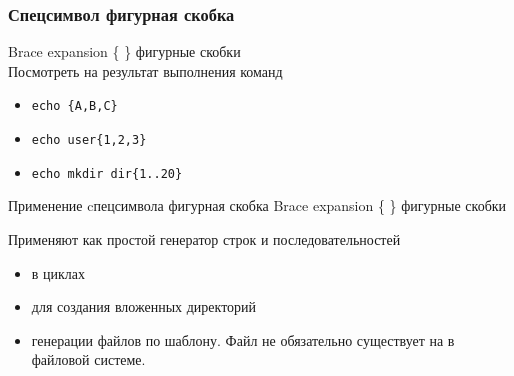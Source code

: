 \begin{frame}[fragile]
	\frametitle{Спецсимвол фигурная скобка}
    Brace expansion  \alert{\{ \}} фигурные скобки \\
	Посмотреть на результат выполнения команд \\

	\begin{itemize}
			\item {\tt echo \{A,B,C\}} 
			\item {\tt echo user\{1,2,3\}}
			\item {\tt echo mkdir dir\{1..20\}}
	\end{itemize}


\end{frame}

\begin{frame}{Применение cпецсимвола фигурная скобка}
    Brace expansion  \alert{\{ \}} фигурные скобки

Применяют как простой генератор строк и последовательностей
\begin{itemize}
    \item в циклах 
    \item для создания вложенных директорий 
    \item генерации файлов по шаблону. Файл не обязательно существует на в файловой системе.
\end{itemize}
\end{frame}
